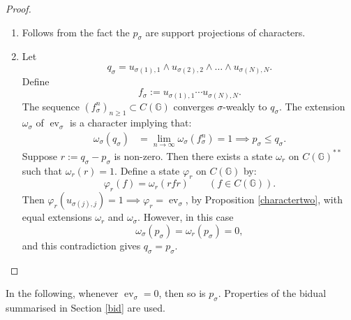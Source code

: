 \documentclass[12pt]{amsart}
\theoremstyle{remark}
\theoremstyle{remark}
\begin{document}
\begin{proof}
  \begin{enumerate}

    \item[(i)]  Follows from the fact the $p_\sigma$ are support projections of characters.

    \item[(ii)]  Let $$q_\sigma=u_{\sigma(1),1}\wedge u_{\sigma(2),2}\wedge\ldots\wedge u_{\sigma(N),N}.$$  Define $$f_\sigma:=u_{\sigma(1),1}\cdots u_{\sigma(N),N}.$$ The sequence $(f_{\sigma}^n)_{n\geq 1}\subset C(\mathbb{G})$ converges $\sigma$-weakly to $q_\sigma$. The extension $\omega_\sigma$ of $\operatorname{ev}_\sigma$ is a character implying that:
    \begin{align*}
      \omega_\sigma(q_\sigma) & =\lim_{n\rightarrow \infty}\omega_\sigma(f_{\sigma}^n) =1 \implies p_\sigma\leq q_\sigma.
    \end{align*}
    Suppose $r:=q_{\sigma}-p_\sigma$ is non-zero. Then there exists a state $\omega_r$ on $C(\mathbb{G})^{**}$ such that $\omega_r(r)=1$.
    Define a state $\varphi_r$ on $C(\mathbb{G})$ by:
    $$\varphi_r(f)=\omega_r(rfr)\qquad (f\in C(\mathbb{G})).$$
    Then $\varphi_r(u_{\sigma(j),j})=1\implies \varphi_r=\operatorname{ev}_\sigma$,
 by Proposition \ref{charactertwo}, with equal extensions $\omega_r$ and $\omega_\sigma$. However, in this case
 $$\omega_\sigma(p_\sigma)=\omega_r(p_\sigma)=0,$$
 and this contradiction gives $q_\sigma=p_\sigma$.


     \end{enumerate}
\end{proof}
 In the following, whenever $\operatorname{ev}_{\sigma}=0$, then so is $p_{\sigma}$. Properties of the bidual summarised in Section \ref{bid} are used.
\end{document}
